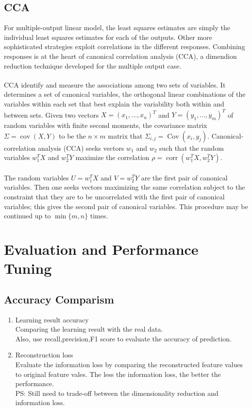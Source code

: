 \documentclass[11pt]{article}
\begin{document}
\subsection{CCA}
For multiple-output linear model, the least squares estimates are simply the individual least squares estimates for each of the outputs. Other more sophisticated strategies exploit correlations in the different responses. Combining responses is at the heart of canonical correlation analysis (CCA), a dimendion reduction technique developed for the multiple output case.\\
\\
CCA identify and measure the associations among two sets of variables. It determines a set of canonical variables, the orthogonal linear combinations of the variables within each set that best explain the variability both within and between sets. Given two vectors $X = (x_1, \dots, x_n)^T$ and $Y = (y_1, \dots, y_m)^T$ of random variables with finite second moments, the covariance matrix $\Sigma = \operatorname{cov}(X, Y)$ to be the  $n \times m$ matrix that $\Sigma_{i,j}=\operatorname{Cov}(x_i,y_j)$.
Canonical-correlation analysis (CCA) seeks vectors $w_1$ and $w_2$ such that the random variables $w_1^TX$ and $w_2^TY$ maximize the correlation $\rho = \operatorname{corr}(w_1^T X, w_2^T Y)$.\\
\\
The random variables $U =w_1^TX$ and $V = w_2^T Y$ are the first pair of canonical variables. Then one seeks vectors maximizing the same correlation subject to the constraint that they are to be uncorrelated with the first pair of canonical variables; this gives the second pair of canonical variables. This procedure may be continued up to $\min\{m,n\}$ times.
\section{Evaluation and Performance Tuning}
\subsection{Accuracy Comparism}
\begin{enumerate}
\item Learning result accuracy\\
Comparing the learning result with the real data.\\
Also, use recall,precision,F1 score to evaluate the accuracy of prediction.
\item Reconstruction loss\\
Evaluate the information loss by comparing the reconstructed feature values to original feature vales.
The less the information loss, the better the performance.\\
PS: Still need to trade-off between the dimensionality reduction and information loss.
\end{enumerate}
\end{document}
